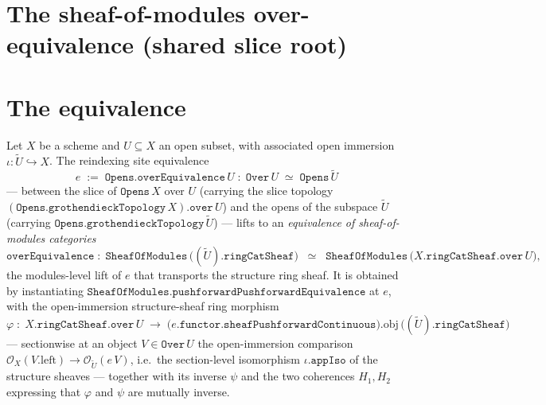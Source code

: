 \section{The sheaf-of-modules over-equivalence (shared slice root)}
\label{mk-chap:Picard_SheafOverEquivalence}

\section{The equivalence}
\label{mk-sec:soe_equivalence}

\begin{definition}\label{mk-def:sheafofmodules_over_equivalence}
  \leanok

  Let \(X\) be a scheme and \(U \subseteq X\) an open subset, with associated open
  immersion \(\iota : \widetilde{U} \hookrightarrow X\). The reindexing site
  equivalence
  \[
    e \;:=\; \mathtt{Opens.overEquivalence}\,U
       \;:\; \mathtt{Over}\,U \;\simeq\; \mathtt{Opens}\,\widetilde{U}
  \]
  --- between the slice of \(\mathtt{Opens}\,X\) over \(U\) (carrying the slice
  topology \((\mathtt{Opens.grothendieckTopology}\,X).\mathtt{over}\,U\)) and the
  opens of the subspace \(\widetilde{U}\) (carrying
  \(\mathtt{Opens.grothendieckTopology}\,\widetilde{U}\)) --- lifts to an
  \emph{equivalence of sheaf-of-modules categories}
  \[
    \mathtt{overEquivalence}\;:\;
      \mathtt{SheafOfModules}\,\bigl((\widetilde{U}).\mathtt{ringCatSheaf}\bigr)
        \;\;\simeq\;\;
      \mathtt{SheafOfModules}\,\bigl(X.\mathtt{ringCatSheaf}.\mathtt{over}\,U\bigr),
  \]
  the modules-level lift of \(e\) that transports the structure ring sheaf. It is
  obtained by instantiating
  \(\mathtt{SheafOfModules.pushforwardPushforwardEquivalence}\) at \(e\), with the
  open-immersion structure-sheaf ring morphism
  \[
    \varphi \;:\;
      X.\mathtt{ringCatSheaf}.\mathtt{over}\,U
      \;\longrightarrow\;
      \bigl(e.\mathtt{functor}.\mathtt{sheafPushforwardContinuous}\bigr).\mathrm{obj}\,
        \bigl((\widetilde{U}).\mathtt{ringCatSheaf}\bigr)
  \]
  --- sectionwise at an object \(V \in \mathtt{Over}\,U\) the open-immersion
  comparison \(\mathcal{O}_X(V.\mathrm{left}) \to \mathcal{O}_{\widetilde{U}}(e\,V)\),
  i.e.\ the section-level isomorphism \(\iota.\mathtt{appIso}\) of the structure
  sheaves --- together with its inverse \(\psi\) and the two coherences
  \(H_1, H_2\) expressing that \(\varphi\) and \(\psi\) are mutually inverse.
\end{definition}

